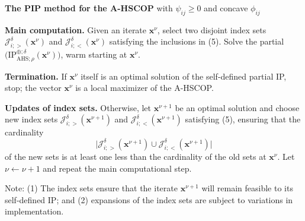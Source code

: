 \documentclass[aspectratio=169,xcolor=dvipsnames]{beamer}
\begin{document}
\begin{frame}
  \footnotesize
  \setlength{\abovedisplayskip}{3pt}
  \setlength{\belowdisplayskip}{3pt}
  \setlength{\parskip}{0.06cm}

  \textbf{The PIP method for the A-HSCOP} \textcolor{MediumRed}{with
  $\psi_{ij}\geq 0$ and concave $\phi_{ij}$}

  \textbf{Main computation.} Given an iterate $\mathbf{x}^\nu$, select two
  disjoint index sets $\mathcal{J}^\delta_{i;>}(\mathbf{x}^\nu)$ and
  $\mathcal{J}^\delta_{i;<}(\mathbf{x}^\nu)$ satisfying the inclusions in (5).
  Solve the partial $\bigl(\mathrm{IP}^{\oplus;\delta}_{\mathrm{AHS};\rho}
  (\mathbf{x}^\nu)\bigr)$, warm starting at $\mathbf{x}^\nu$.

  \textbf{Termination.} If $\mathbf{x}^\nu$ itself is an optimal solution of
  the self-defined partial IP, stop; the vector $\mathbf{x}^\nu$ is a local
  maximizer of the A-HSCOP.

  \textbf{Updates of index sets.} Otherwise, let $\mathbf{x}^{\nu+1}$ be an
  optimal solution and choose new index sets
  $\mathcal{J}^\delta_{i;>}(\mathbf{x}^{\nu+1})$ and
  $\mathcal{J}^\delta_{i;<}(\mathbf{x}^{\nu+1})$ satisfying (5), ensuring that
  the cardinality
  \[
    \bigl|\mathcal{J}^\delta_{i;>}(\mathbf{x}^{\nu+1})\cup
      \mathcal{J}^\delta_{i;<}(\mathbf{x}^{\nu+1})\bigr|
  \]
  of the new sets is at least one less than the cardinality of the old sets
  at $\mathbf{x}^\nu$. Let $\nu\leftarrow\nu+1$ and repeat the main
  computational step.

  \textcolor{MediumRed}{Note:} (1) The index sets ensure that the iterate
  $\mathbf{x}^{\nu+1}$ will remain feasible to its self-defined IP; and (2)
  expansions of the index sets are subject to variations in implementation.
\end{frame}
\end{document}
